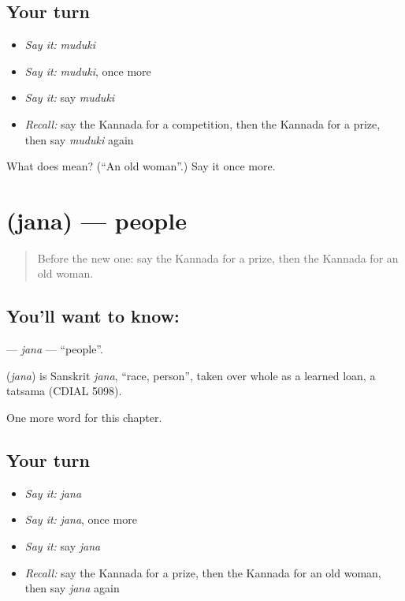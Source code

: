 \subsection*{Your turn}
\begin{itemize}
\raggedright
  \item \emph{Say it:} \emph{muduki}
  \item \emph{Say it:} \emph{muduki}, once more
  \item \emph{Say it:} say \emph{muduki}
  \item \emph{Recall:} say the Kannada for a competition, then the Kannada for a prize, then say \emph{muduki} again
\end{itemize}

\begin{tcolorbox}[breakable,colback=teal!4,colframe=teal!35!black,title={Before you move on}]
What does  mean? (\textquotedblleft{}An old woman\textquotedblright{}.) Say it once more.
\end{tcolorbox}
\section[\texorpdfstring{\kn{ಜನ} (jana)}{ಜನ (jana)}]{ (jana) — people}

\label{lesson:KA-C299-jana}



\begin{quote}
Before the new one: say the Kannada for a prize, then the Kannada for an old woman.
\end{quote}

\subsection*{You'll want to know: }
\textbf{} — \emph{jana} — \textquotedblleft{}people\textquotedblright{}.

\begin{cousinweb}
\textbf{} (\emph{jana}) is Sanskrit \emph{jana}, \textquotedblleft{}race, person\textquotedblright{}, taken over whole as a learned loan, a tatsama (CDIAL 5098).
\end{cousinweb}

\begin{grammarlens}[title={What you've built}]
One more word for this chapter.
\end{grammarlens}

\subsection*{Your turn}
\begin{itemize}
\raggedright
  \item \emph{Say it:} \emph{jana}
  \item \emph{Say it:} \emph{jana}, once more
  \item \emph{Say it:} say \emph{jana}
  \item \emph{Recall:} say the Kannada for a prize, then the Kannada for an old woman, then say \emph{jana} again
\end{itemize}

